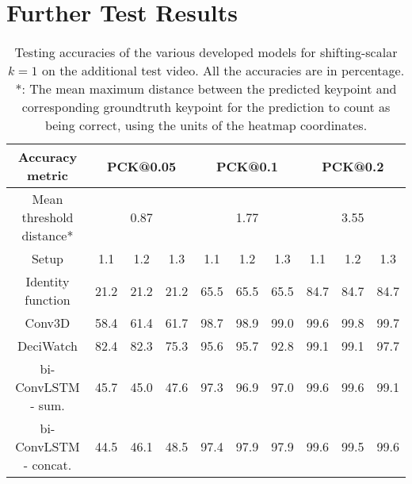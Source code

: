 \documentclass[./main.tex]{subfiles}
\begin{document}
\section{Further Test Results}
\begin{table}[htbp]
    \begin{tabular}{c||ccc|ccc|ccc}
        \hline
        Accuracy metric & \multicolumn{3}{c}{PCK@0.05} & \multicolumn{3}{c}{PCK@0.1} & \multicolumn{3}{c}{PCK@0.2} \\
        \hline
        Mean threshold distance* & \multicolumn{3}{c}{0.87} & \multicolumn{3}{c}{1.77} & \multicolumn{3}{c}{3.55} \\
        \hline
        Setup & 1.1 & 1.2 & 1.3 & 1.1 & 1.2 & 1.3 & 1.1 & 1.2 & 1.3 \\
        \hline
        \hline
        Identity function & 21.2 & 21.2 & 21.2 & 65.5 & 65.5 & 65.5 & 84.7 & 84.7 & 84.7 \\
        Conv3D & 58.4 & 61.4 & 61.7 & 98.7 & 98.9 & 99.0 & 99.6 & 99.8 & 99.7 \\
        DeciWatch & 82.4 & 82.3 & 75.3 & 95.6 & 95.7 & 92.8 & 99.1 & 99.1 & 97.7 \\
        bi-ConvLSTM - sum. & 45.7 & 45.0 & 47.6 & 97.3 & 96.9 & 97.0 & 99.6 & 99.6 & 99.1 \\
        bi-ConvLSTM - concat. & 44.5 & 46.1 & 48.5 & 97.4 & 97.9 & 97.9 & 99.6 & 99.5 & 99.6 \\
        \hline
    \end{tabular}
    \caption{Testing accuracies of the various developed models for shifting-scalar $k = 1$ on the additional test video. All the accuracies are in percentage. *: The mean maximum distance between the predicted keypoint and corresponding groundtruth keypoint for the prediction to count as being correct, using the units of the heatmap coordinates.}
    \label{tab:finetune_test_accs_3}
\end{table}
\end{document}
